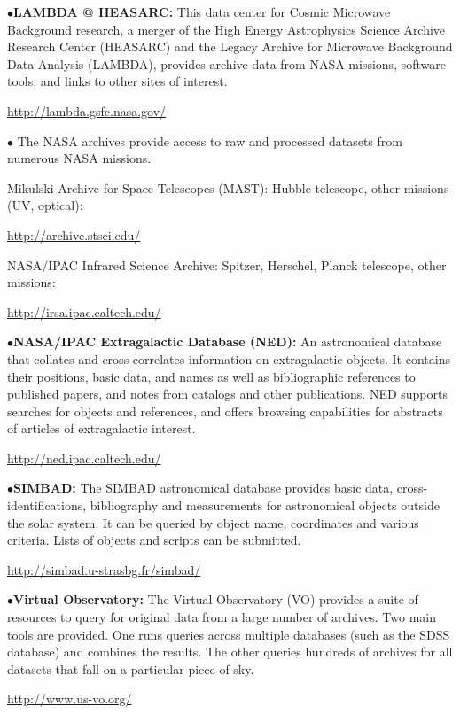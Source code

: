 \item{$\bullet$}{\bf LAMBDA @ HEASARC:} 
This data center for Cosmic Microwave Background research, a merger of the High Energy Astrophysics Science Archive Research Center (HEASARC) and the Legacy Archive for Microwave Background Data Analysis (LAMBDA), provides archive data from NASA missions, software tools, and links to other sites of interest.
	\item{}\qquad\url{http://lambda.gsfc.nasa.gov/}

\medskip

\item{$\bullet$}
The NASA archives provide access to raw and processed datasets from numerous NASA missions. 
\item{}
Mikulski Archive for Space Telescopes (MAST): Hubble telescope, other missions (UV, optical):
	\item{}\qquad\url{http://archive.stsci.edu/} 
\item{}
NASA/IPAC Infrared Science Archive: Spitzer, Herschel, Planck telescope, other missions: \item{}\qquad\url{http://irsa.ipac.caltech.edu/}

\medskip

\item{$\bullet$}{\bf NASA/IPAC Extragalactic Database (NED):}
An astronomical database that collates and cross-correlates information on extragalactic objects. It contains their positions, basic data, and names as well as bibliographic references to published papers, and notes from catalogs and other publications. NED supports searches for objects and references, and offers browsing capabilities for abstracts of articles of extragalactic interest.
	\item{}\qquad\url{http://ned.ipac.caltech.edu/}

\medskip

\item{$\bullet$}{\bf SIMBAD:}
The SIMBAD astronomical database provides basic data, cross-identifications, bibliography and measurements for astronomical objects outside the solar system. It can be queried by object name, coordinates and various criteria. Lists of objects and scripts can be submitted.
	\item{}\qquad\url{http://simbad.u-strasbg.fr/simbad/}

\medskip

\item{$\bullet$}{\bf Virtual Observatory:}
The Virtual Observatory (VO) provides a suite of resources to query for original data from a large number of archives. Two main tools are provided. One runs queries across multiple databases (such as the SDSS database) and combines the results. The other queries hundreds of archives for all datasets that fall on a particular piece of sky.
	\item{}\qquad\url{http://www.us-vo.org/}

